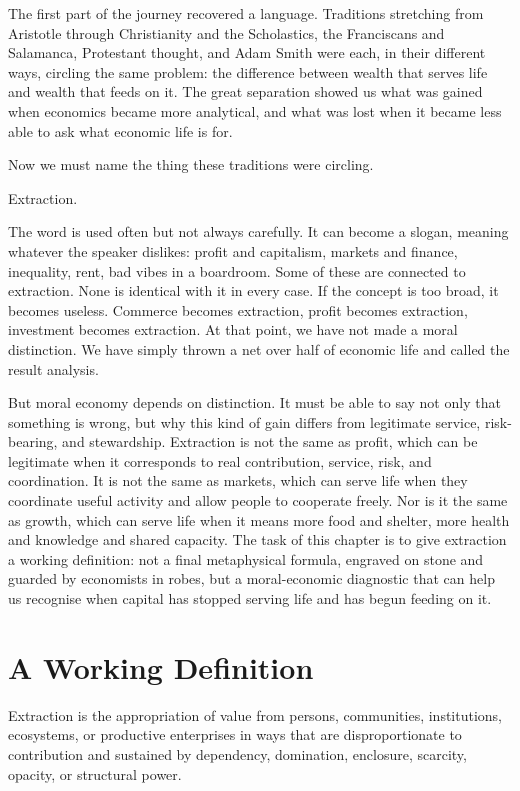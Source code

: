 \documentclass[11pt,a4paper,oneside]{book}
\begin{document}
The first part of the journey recovered a language. Traditions stretching from Aristotle through Christianity and the Scholastics, the Franciscans and Salamanca, Protestant thought, and Adam Smith were each, in their different ways, circling the same problem: the difference between wealth that serves life and wealth that feeds on it. The great separation showed us what was gained when economics became more analytical, and what was lost when it became less able to ask what economic life is for.

Now we must name the thing these traditions were circling.

Extraction.

The word is used often but not always carefully. It can become a slogan, meaning whatever the speaker dislikes: profit and capitalism, markets and finance, inequality, rent, bad vibes in a boardroom. Some of these are connected to extraction. None is identical with it in every case. If the concept is too broad, it becomes useless. Commerce becomes extraction, profit becomes extraction, investment becomes extraction. At that point, we have not made a moral distinction. We have simply thrown a net over half of economic life and called the result analysis.

But moral economy depends on distinction. It must be able to say not only that something is wrong, but why this kind of gain differs from legitimate service, risk-bearing, and stewardship. Extraction is not the same as profit, which can be legitimate when it corresponds to real contribution, service, risk, and coordination. It is not the same as markets, which can serve life when they coordinate useful activity and allow people to cooperate freely. Nor is it the same as growth, which can serve life when it means more food and shelter, more health and knowledge and shared capacity. The task of this chapter is to give extraction a working definition: not a final metaphysical formula, engraved on stone and guarded by economists in robes, but a moral-economic diagnostic that can help us recognise when capital has stopped serving life and has begun feeding on it.

\section*{A Working Definition}

Extraction is the appropriation of value from persons, communities, institutions, ecosystems, or productive enterprises in ways that are disproportionate to contribution and sustained by dependency, domination, enclosure, scarcity, opacity, or structural power.
\end{document}
